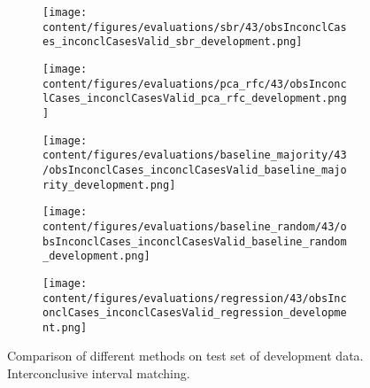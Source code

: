 \begin{figure}[t]
  \begin{subfigure}{0.5\textwidth}
    \centering
    \texttt{[image: content/figures/evaluations/sbr/43/obsInconclCases\_inconclCasesValid\_sbr\_development.png]}
  \end{subfigure}
  \hfill
  \begin{subfigure}{0.5\textwidth}
    \centering
    \texttt{[image: content/figures/evaluations/pca\_rfc/43/obsInconclCases\_inconclCasesValid\_pca\_rfc\_development.png]}
  \end{subfigure}
  \hfill
  \begin{subfigure}{0.5\textwidth}
    \centering
    \texttt{[image: content/figures/evaluations/baseline\_majority/43/obsInconclCases\_inconclCasesValid\_baseline\_majority\_development.png]}
  \end{subfigure}
  \hfill
  \begin{subfigure}{0.5\textwidth}
    \centering
    \texttt{[image: content/figures/evaluations/baseline\_random/43/obsInconclCases\_inconclCasesValid\_baseline\_random\_development.png]}
  \end{subfigure}
  \hfill
  \begin{subfigure}{0.5\textwidth}
    \centering
    \texttt{[image: content/figures/evaluations/regression/43/obsInconclCases\_inconclCasesValid\_regression\_development.png]}
  \end{subfigure}

  \caption{Comparison of different methods on test set of development data. Interconclusive interval matching.}
  \label{fig:test_interval_match_dev}
\end{figure}


